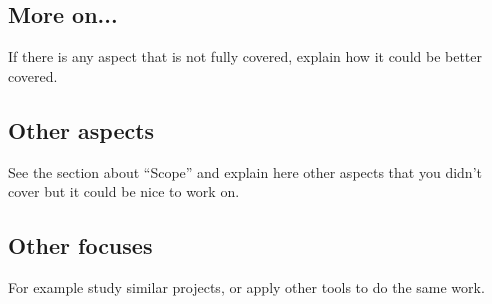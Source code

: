 \documentclass[a4paper, 12pt]{book}
\begin{document}
\subsection{More on...}

If there is any aspect that is not fully covered, explain how it could be
better covered.

\subsection{Other aspects}

See the section about ``Scope'' and explain here other aspects that you didn't
cover but it could be nice to work on.


\subsection{Other focuses}

For example study similar projects, or apply other tools to do the same work.

\appendix
\end{document}
